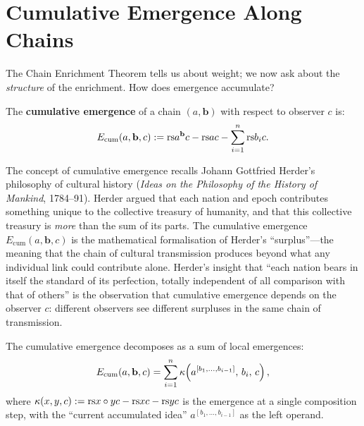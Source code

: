 \section{Cumulative Emergence Along Chains}

The Chain Enrichment Theorem tells us about weight; we now ask about the
\emph{structure} of the enrichment.  How does emergence accumulate?

\begin{definition}
\label{def:cumulative-emergence}
The \textbf{cumulative emergence} of a chain $(a, \mathbf{b})$ with respect
to observer $c$ is:
\[
  E_{\mathrm{cum}}(a, \mathbf{b}, c)
  := \mathrm{rs}{a^{\mathbf{b}}}{c} - \mathrm{rs}{a}{c}
     - \sum_{i=1}^{n} \mathrm{rs}{b_i}{c}.
\]
\end{definition}

\begin{remark}
\label{rem:ch8:cumulative_emergence_herder}
The concept of cumulative emergence recalls Johann Gottfried Herder's
philosophy of cultural history (\emph{Ideas on the Philosophy of the
History of Mankind}, 1784--91).  Herder argued that each nation and epoch
contributes something unique to the collective treasury of humanity, and
that this collective treasury is \emph{more} than the sum of its parts.
The cumulative emergence $E_{\mathrm{cum}}(a, \mathbf{b}, c)$ is the
mathematical formalisation of Herder's ``surplus''---the meaning that the
chain of cultural transmission produces beyond what any individual link
could contribute alone.  Herder's insight that ``each nation bears in itself
the standard of its perfection, totally independent of all comparison with
that of others'' is the observation that cumulative emergence depends on
the observer $c$: different observers see different surpluses in the same
chain of transmission.
\end{remark}



\begin{theorem}
\label{thm:emergence-decomposition}
The cumulative emergence decomposes as a sum of local emergences:
\[
  E_{\mathrm{cum}}(a, \mathbf{b}, c)
  = \sum_{i=1}^{n}
    \kappa\!\left(
      a^{[b_1, \ldots, b_{i-1}]},\, b_i,\, c
    \right),
\]
where $\kappa(x, y, c) := \mathrm{rs}{x \circ y}{c} - \mathrm{rs}{x}{c} - \mathrm{rs}{y}{c}$ is
the emergence at a single composition step, with the ``current accumulated
idea'' $a^{[b_1, \ldots, b_{i-1}]}$ as the left operand.
\end{theorem}

